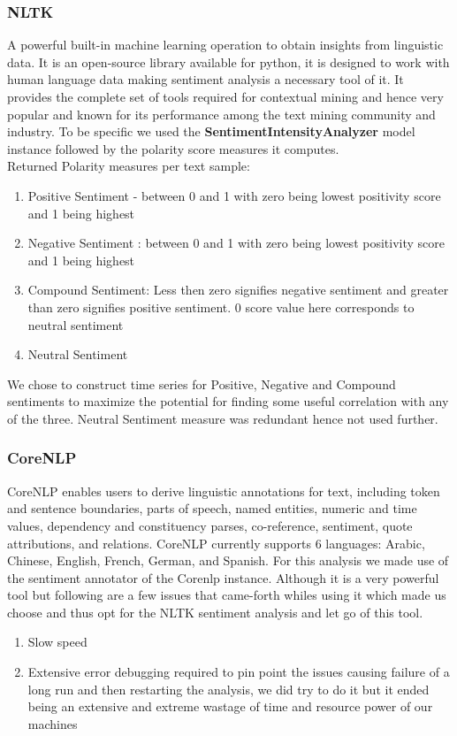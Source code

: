 \documentclass[sigconf, nonacm]{acmart}
\begin{document}
\subsubsection{NLTK}
A powerful built-in machine learning operation to obtain insights from linguistic data. It is an open-source library available for python, it is designed to work with human language data making sentiment analysis a necessary tool of it. It provides the complete set of tools required for contextual mining and hence very popular and known for its performance among the text mining community and industry. To be specific we used the \textbf{SentimentIntensityAnalyzer} model instance followed by the polarity score measures it computes.
\\Returned Polarity measures per text sample:
\begin{enumerate}
    \item Positive Sentiment - between 0 and 1 with zero being lowest positivity score and 1 being highest
    \item Negative Sentiment : between 0 and 1 with zero being lowest positivity score and 1 being highest
    \item Compound Sentiment: Less then zero signifies negative sentiment and greater than zero signifies positive sentiment. 0 score value here corresponds to neutral sentiment
    \item Neutral Sentiment
\end{enumerate}
We chose to construct time series for Positive, Negative and Compound sentiments to maximize the potential for finding some useful correlation with any of the three. Neutral Sentiment measure was redundant hence not used further.

\subsubsection{CoreNLP}
CoreNLP enables users to derive linguistic annotations for text, including token and sentence boundaries, parts of speech, named entities, numeric and time values, dependency and constituency parses, co-reference, sentiment, quote attributions, and relations. CoreNLP currently supports 6 languages: Arabic, Chinese, English, French, German, and Spanish. For this analysis we made use of the sentiment annotator of the Corenlp instance. Although it is a very powerful tool but following are a few issues that came-forth whiles using it which  made us choose and thus opt for the NLTK sentiment analysis and let go of this tool.
\begin{enumerate}
    \item Slow speed
    \item Extensive error debugging required to pin point the issues causing failure of a long run and then restarting the analysis, we did try to do it but it ended being an extensive and extreme wastage of time and resource power of our machines
\end{enumerate}
\end{document}
